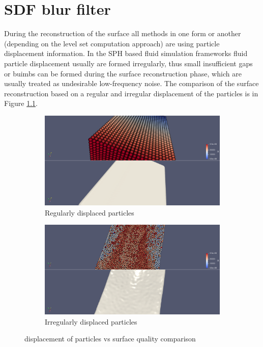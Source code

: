 \chapter{SDF blur filter}
During the reconstruction of the surface all methods in one form or another (depending on the level set computation approach) are using particle displacement information. In the SPH based fluid simulation frameworks fluid particle displacement usually are formed irregularly, thus small insufficient gaps or buimbs can be formed during the surface reconstruction phase, which are usually treated as undesirable low-frequency noise. The comparison of the surface reconstruction based on a regular and irregular displacement of the particles is in Figure \ref{fig:rec_vs_displacement}.
\begin{figure}[H]
	\begin{center}
		\begin{subfigure}[b]{0.6\textwidth}
			\includegraphics[width=\textwidth]{figures/FlatSurfaceWsParticleDisplacement.png}
			\caption{Regularly displaced particles}
		\end{subfigure}
		\begin{subfigure}[b]{0.6\textwidth}
			\includegraphics[width=\textwidth]{figures/NonFlatSurfaceWsParticleDisplacement.png}
			\caption{Irregularly displaced particles}
		\end{subfigure}
	\end{center}
	\caption{displacement of particles vs surface quality comparison}
	\label{fig:rec_vs_displacement}
\end{figure}
